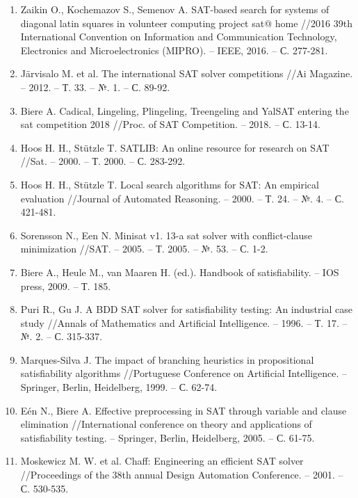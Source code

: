 \begin{enumerate}[label=\arabic{*}.]
\item
Zaikin O., Kochemazov S., Semenov A. SAT-based search for systems of diagonal latin squares in volunteer computing project sat@ home //2016 39th International Convention on Information and Communication Technology, Electronics and Microelectronics (MIPRO). – IEEE, 2016. – С. 277-281.

\item
Järvisalo M. et al. The international SAT solver competitions //Ai Magazine. – 2012. – Т. 33. – №. 1. – С. 89-92.
	
\item
Biere A. Cadical, Lingeling, Plingeling, Treengeling and YalSAT entering the sat competition 2018 //Proc. of SAT Competition. – 2018. – С. 13-14.

\item
Hoos H. H., Stützle T. SATLIB: An online resource for research on SAT //Sat. – 2000. – Т. 2000. – С. 283-292.

\item
Hoos H. H., Stützle T. Local search algorithms for SAT: An empirical evaluation //Journal of Automated Reasoning. – 2000. – Т. 24. – №. 4. – С. 421-481.

\item
Sorensson N., Een N. Minisat v1. 13-a sat solver with conflict-clause minimization //SAT. – 2005. – Т. 2005. – №. 53. – С. 1-2.

\item
Biere A., Heule M., van Maaren H. (ed.). Handbook of satisfiability. – IOS press, 2009. – Т. 185.

\item
Puri R., Gu J. A BDD SAT solver for satisfiability testing: An industrial case study //Annals of Mathematics and Artificial Intelligence. – 1996. – Т. 17. – №. 2. – С. 315-337.

\item
Marques-Silva J. The impact of branching heuristics in propositional satisfiability algorithms //Portuguese Conference on Artificial Intelligence. – Springer, Berlin, Heidelberg, 1999. – С. 62-74.

\item
Eén N., Biere A. Effective preprocessing in SAT through variable and clause elimination //International conference on theory and applications of satisfiability testing. – Springer, Berlin, Heidelberg, 2005. – С. 61-75.

\item
Moskewicz M. W. et al. Chaff: Engineering an efficient SAT solver //Proceedings of the 38th annual Design Automation Conference. – 2001. – С. 530-535.


\end{enumerate}
